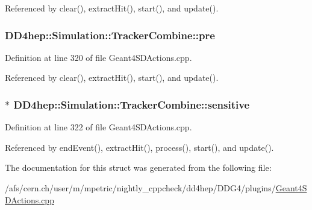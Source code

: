 Referenced by clear(), extractHit(), start(), and update().\hypertarget{struct_d_d4hep_1_1_simulation_1_1_tracker_combine_a05e41bf826c42ad8e4ddefb914a9e079}{
\subsubsection[{pre}]{ {\bf DD4hep::Simulation::TrackerCombine::pre}}}
\label{struct_d_d4hep_1_1_simulation_1_1_tracker_combine_a05e41bf826c42ad8e4ddefb914a9e079}


Definition at line 320 of file Geant4SDActions.cpp.

Referenced by clear(), extractHit(), start(), and update().\hypertarget{struct_d_d4hep_1_1_simulation_1_1_tracker_combine_afa91afc4a7df2a80a889ab1a1ba4d4b6}{
\subsubsection[{sensitive}]{$\ast$ {\bf DD4hep::Simulation::TrackerCombine::sensitive}}}
\label{struct_d_d4hep_1_1_simulation_1_1_tracker_combine_afa91afc4a7df2a80a889ab1a1ba4d4b6}


Definition at line 322 of file Geant4SDActions.cpp.

Referenced by endEvent(), extractHit(), process(), start(), and update().

The documentation for this struct was generated from the following file:\begin{DoxyCompactItemize}
\item 
/afs/cern.ch/user/m/mpetric/nightly\_\-cppcheck/dd4hep/DDG4/plugins/\hyperlink{_geant4_s_d_actions_8cpp}{Geant4SDActions.cpp}\end{DoxyCompactItemize}
